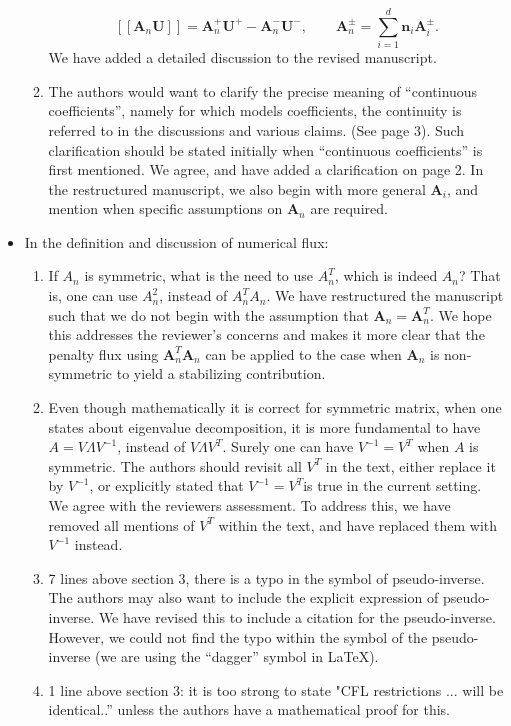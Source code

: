 \documentclass[10pt]{article}
\newcommand{\LRs}[1]{\left[ #1 \right]}
\newcommand{\jump}[1] {\ensuremath{\LRs{\![#1]\!}}}
\newcommand{\note}[1]{{\color{blue}#1}}
\begin{document}
\begin{itemize}
\begin{enumerate}
{\[
\jump{\bm{A}_n\bm{U}} = \bm{A}_n^+\bm{U}^+ - \bm{A}_n^-\bm{U}^-, \qquad \bm{A}_n^{\pm} = \sum_{i=1}^d \bm{n}_i \bm{A}_i^{\pm}.
\]
We have added a detailed discussion to the revised manuscript.  }
\item The authors would want to clarify the precise meaning of ``continuous coefficients'', namely for which models coefficients, the continuity is referred to in the discussions and various claims. (See page 3). Such clarification should be stated initially when ``continuous coefficients'' is first mentioned.  
\note{We agree, and have added a clarification on page 2.  In the restructured manuscript, we also begin with more general $\bm{A}_i$, and mention when specific assumptions on $\bm{A}_n$ are required.  }
\end{enumerate}
\item In the definition and discussion of numerical flux: 
\begin{enumerate}
\item If $A_n$ is symmetric, what is the need to use $A_n^T$, which is indeed $A_n$? That is, one can use $A_n^2$, instead of $A_n^TA_n$.  
\note{We have restructured the manuscript such that we do not begin with the assumption that $\bm{A}_n = \bm{A}_n^T$.  We hope this addresses the reviewer's concerns and makes it more clear that the penalty flux using $\bm{A}_n^T\bm{A}_n$ can be applied to the case when $\bm{A}_n$ is non-symmetric to yield a stabilizing contribution. }
\item Even though mathematically it is correct for symmetric matrix, when one states about eigenvalue decomposition, it is more fundamental to have $A = V\Lambda V^{-1}$, instead of $V \Lambda V^{T}$. Surely one can have $V^{-1}=V^{T}$ when $A$ is symmetric. The authors should revisit all $V^{T}$ in the text, either replace it by $V^{-1}$, or explicitly stated that $V^{-1}=V^{T} $is true in the current setting.  
\note{We agree with the reviewers assessment.  To address this, we have removed all mentions of $V^T$ within the text, and have replaced them with $V^{-1}$ instead.}
\item 7 lines above section 3, there is a typo in the symbol of pseudo-inverse. The authors may also want to include the explicit expression of pseudo-inverse.
\note{We have revised this to include a citation for the pseudo-inverse.  However, we could not find the typo within the symbol of the pseudo-inverse (we are using the ``dagger'' symbol in \LaTeX).  }
\item 1 line above section 3: it is too strong to state "CFL restrictions ... will be identical..'' unless the authors have a mathematical proof for this.

\end{enumerate}
\end{itemize}
\end{document}
